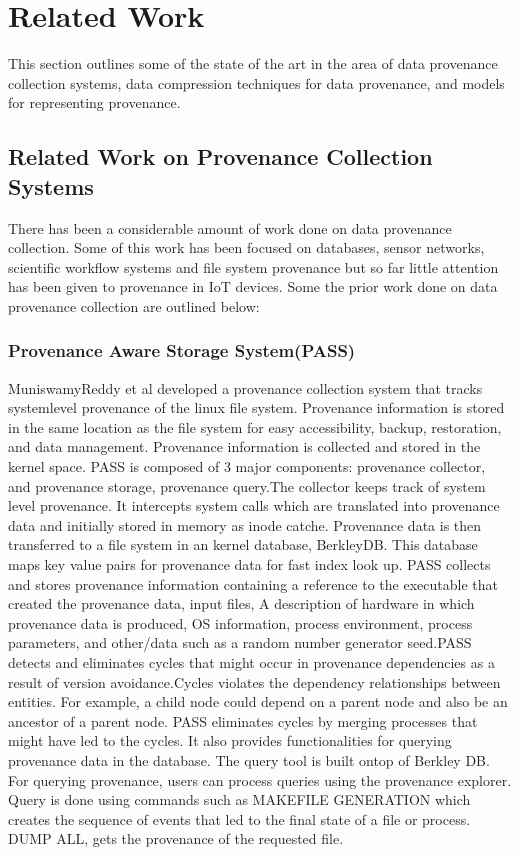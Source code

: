 


\chapter{Related Work}\label{background}

This section outlines some of the state of the art in the area of data provenance collection systems, data compression techniques for data provenance, and models for representing provenance.


\section{Related Work on Provenance Collection Systems}

There has been a considerable amount of work done on data provenance collection. Some of this work has been focused on databases, sensor networks, scientific workflow systems and file system provenance but so far little attention has been given to provenance in IoT devices. Some the prior work done on data provenance collection are outlined below:

\subsection{Provenance Aware Storage System(PASS)}
MuniswamyReddy
et al developed a provenance collection system that tracks  system\-level provenance of the linux file system. Provenance information
is stored in the same location as the file system for easy accessibility, backup,
restoration, and data management. Provenance information is collected and stored in
the kernel space. PASS is composed of 3 major components: provenance collector, and provenance storage, provenance query.The collector keeps track of system level provenance. It intercepts system calls which are translated into provenance data and initially stored in memory as inode catche. Provenance data is then transferred to a file system in an kernel database, BerkleyDB. This database maps key value pairs for provenance data for fast index look up. PASS collects and stores provenance information containing a reference to the executable that created the provenance data, input files, A description of hardware in which provenance data is produced, OS information, process environment, process parameters, and other/data such as a random number generator seed.PASS detects and eliminates cycles that might occur in provenance dependencies as a result of version avoidance.Cycles violates the dependency relationships between entities. For example, a child node could depend on a parent node and also be an ancestor of a parent node. PASS eliminates cycles by merging processes that might have led to the cycles. It also provides functionalities for querying provenance data in the database. The query tool is built ontop of Berkley DB. For querying provenance, users can process queries using the provenance explorer. Query is done using commands such as MAKEFILE  GENERATION which creates the sequence of events that led to the final state of a file or process. DUMP ALL, gets the provenance of the requested file. 

